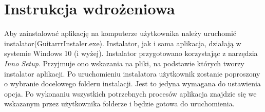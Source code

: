 \chapter{Instrukcja wdrożeniowa}

Aby zainstalować aplikację na komputerze użytkownika należy uruchomić instalator(GuitarrrInstaler.exe). Instalator, jak i sama aplikacja, działają w systemie Windows 10 (i wyżej). Instalator przygotowano korzystając z narzędzia \emph{Inno Setup}. Przyjmuje ono wskazania na pliki, na podstawie których tworzy instalator aplikacji. 
Po uruchomieniu instalatora użytkownik zostanie poproszony o wybranie docelowego folderu instalacji. Jest to jedyna wymagana do ustawienia opcja. Po wykonaniu wszystkich potrzebnych procesów aplikacja znajdzie się we wskazanym przez użytkownika folderze i będzie gotowa do uruchomienia.
